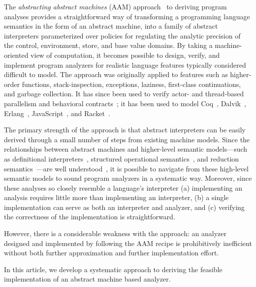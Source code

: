 \documentclass[preprint,onecolumn,9pt]{sigplanconf} %
\begin{document}
The \emph{abstracting abstract machines} (AAM)
approach~\cite{dvanhorn:VanHorn2011Abstracting,dvanhorn:VanHorn2012Systematic}
to deriving program analyses provides a straightforward way of
transforming a programming language semantics in the form of an
abstract machine, into a family of abstract interpreters parameterized
over policies for regulating the analytic precision of the control,
environment, store, and base value domains.  By taking a
machine-oriented view of computation, it becomes possible to design,
verify, and implement program analyzers for realistic language
features typically considered difficult to model.  The approach was
originally applied to features such as higher-order functions,
stack-inspection, exceptions, laziness, first-class continuations, and
garbage collection.  It has since been used to verify actor-
\cite{local:DOsualdo:12A} and
thread-based~\cite{dvanhorn:Might2011Family} parallelism and
behavioral contracts~\cite{dvanhorn:TobinHochstadt2012Higherorder}; it
has been used to model Coq~\cite{local:harvard},
Dalvik~\cite{local:dalvik}, Erlang~\cite{local:DOsualdo:12B},
JavaScript~\cite{local:DBLP:journals/corr/abs-1109-4467}, and
Racket~\cite{dvanhorn:TobinHochstadt2012Higherorder}.

The primary strength of the approach is that abstract interpreters can
be easily derived through a small number of steps from existing
machine models.  Since the relationships between abstract machines and
higher-level semantic models---such as definitional
interpreters~\cite{dvanhorn:reynolds-hosc98}, structured operational
semantics~\cite{dvanhorn:Plotkin1981Structural}, and reduction
semantics~\cite{dvanhorn:Felleisen2009Semantics}---are well
understood~\cite{dvanhorn:Danvy:DSc}, it is possible to navigate from
these high-level semantic models to sound program analyzers in a
systematic way.  Moreover, since these analyses so closely resemble a
language's interpreter (a) implementing an analysis requires little
more than implementing an interpreter, (b) a single implementation can
serve as both an interpreter and analyzer, and (c) verifying the
correctness of the implementation is straightforward.

However, there is a considerable weakness with the approach: an
analyzer designed and implemented by following the AAM recipe is
prohibitively inefficient without both further approximation and
further implementation effort.

In this article, we develop a systematic approach to deriving the
feasible implementation of an abstract machine based analyzer.
\end{document}
